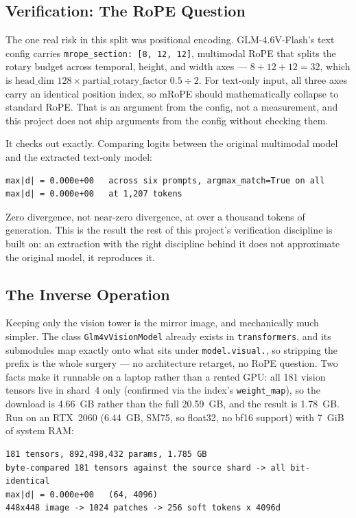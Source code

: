 \documentclass[11pt]{article}
\begin{document}
\subsection{Verification: The RoPE Question}

The one real risk in this split was positional encoding. GLM-4.6V-Flash's text config
carries \texttt{mrope\_section: [8, 12, 12]}, multimodal RoPE that splits the rotary
budget across temporal, height, and width axes --- $8+12+12=32$, which is
$\text{head\_dim } 128 \times \text{partial\_rotary\_factor } 0.5 \div 2$. For text-only
input, all three axes carry an identical position index, so mRoPE should mathematically
collapse to standard RoPE. That is an argument from the config, not a measurement, and
this project does not ship arguments from the config without checking them.

It checks out exactly. Comparing logits between the original multimodal model and the
extracted text-only model:

\begin{lstlisting}
max|d| = 0.000e+00   across six prompts, argmax_match=True on all
max|d| = 0.000e+00   at 1,207 tokens
\end{lstlisting}

Zero divergence, not near-zero divergence, at over a thousand tokens of generation. This
is the result the rest of this project's verification discipline is built on: an
extraction with the right discipline behind it does not approximate the original model,
it reproduces it.

\subsection{The Inverse Operation}

Keeping only the vision tower is the mirror image, and mechanically much simpler. The
class \texttt{Glm4vVisionModel} already exists in \texttt{transformers}, and its
submodules map exactly onto what sits under \texttt{model.visual.}, so stripping the
prefix is the whole surgery --- no architecture retarget, no RoPE question. Two facts
make it runnable on a laptop rather than a rented GPU: all 181 vision tensors live in
shard~4 only (confirmed via the index's \texttt{weight\_map}), so the download is
4.66~GB rather than the full 20.59~GB, and the result is 1.78~GB. Run on an RTX~2060
(6.44~GB, SM75, so float32, no bf16 support) with 7~GiB of system RAM:

\begin{lstlisting}
181 tensors, 892,498,432 params, 1.785 GB
byte-compared 181 tensors against the source shard -> all bit-identical
max|d| = 0.000e+00   (64, 4096)
448x448 image -> 1024 patches -> 256 soft tokens x 4096d
\end{lstlisting}
\end{document}
